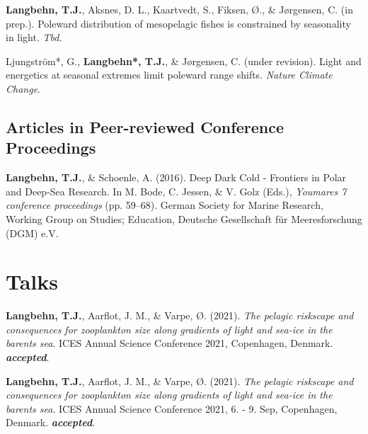 \documentclass[11pt, a4paper]{awesome-cv}
\begin{document}
\leavevmode\hypertarget{ref-Langbehnh}{}%
\textbf{Langbehn, T.J.}, Aksnes, D. L., Kaartvedt, S., Fiksen, Ø., \&
Jørgensen, C. (in prep.). Poleward distribution of mesopelagic fishes is
constrained by seasonality in light. \emph{Tbd}.

\leavevmode\hypertarget{ref-Ljungstrom}{}%
Ljungström*, G., \textbf{Langbehn*, T.J.}, \& Jørgensen, C. (under
revision). Light and energetics at seasonal extremes limit poleward
range shifts. \emph{Nature Climate Change}.

\endgroup

\hypertarget{articles-in-peer-reviewed-conference-proceedings}{%
\subsection{Articles in Peer-reviewed Conference
Proceedings}\label{articles-in-peer-reviewed-conference-proceedings}}

\begingroup
\setlength{\parindent}{-0.5in}
\setlength{\leftskip}{0.5in}

\hypertarget{refs_proceedings}{}
\leavevmode\hypertarget{ref-Langbehn2016c}{}%
\textbf{Langbehn, T.J.}, \& Schoenle, A. (2016). Deep \textbar{} Dark
\textbar{} Cold - Frontiers in Polar and Deep-Sea Research. In M. Bode,
C. Jessen, \& V. Golz (Eds.), \emph{Youmares 7 conference proceedings}
(pp. 59--68). German Society for Marine Research, Working Group on
Studies; Education, Deutsche Gesellschaft für Meeresforschung (DGM) e.V.

\endgroup

\hypertarget{talks}{%
\section{Talks}\label{talks}}

\begingroup
\setlength{\parindent}{-0.5in}
\setlength{\leftskip}{0.5in}

\hypertarget{refs_talks}{}
\leavevmode\hypertarget{ref-Langbehn12}{}%
\textbf{Langbehn, T.J.}, Aarflot, J. M., \& Varpe, Ø. (2021). \emph{The
pelagic riskscape and consequences for zooplankton size along gradients
of light and sea-ice in the barents sea}. ICES Annual Science Conference
2021, Copenhagen, Denmark. \emph{\textbf{accepted}}.

\leavevmode\hypertarget{ref-Langbehn13}{}%
\textbf{Langbehn, T.J.}, Aarflot, J. M., \& Varpe, Ø. (2021). \emph{The
pelagic riskscape and consequences for zooplankton size along gradients
of light and sea-ice in the barents sea}. ICES Annual Science Conference
2021, 6. - 9. Sep, Copenhagen, Denmark. \emph{\textbf{accepted}}.
\end{document}

